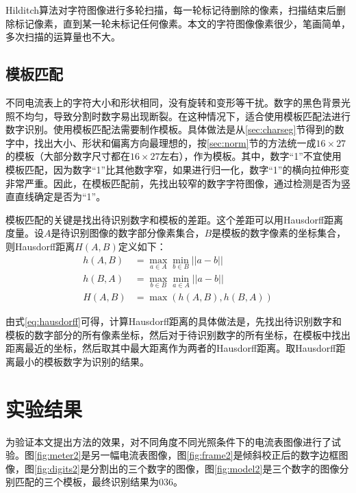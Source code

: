 Hilditch算法对字符图像进行多轮扫描，每一轮标记待删除的像素，扫描结束后删除标记像素，直到某一轮未标记任何像素。本文的字符图像像素很少，笔画简单，多次扫描的运算量也不大。

\subsection{模板匹配}

不同电流表上的字符大小和形状相同，没有旋转和变形等干扰。数字的黑色背景光照不均匀，导致分割时数字易出现断裂。在这种情况下，适合使用模板匹配法进行数字识别。使用模板匹配法需要制作模板。具体做法是从\ref{sec:charseg}节得到的数字中，找出大小、形状和偏离方向最理想的，按\ref{sec:norm}节的方法统一成$16\times 27$的模板（大部分数字尺寸都在$16\times 27$左右），作为模板。其中，数字“1”不宜使用模板匹配，因为数字“1”比其他数字窄，如果进行归一化，数字“1”的横向拉伸形变非常严重。因此，在模板匹配前，先找出较窄的数字字符图像，通过检测是否为竖直直线确定是否为“1”。

模板匹配的关键是找出待识别数字和模板的差距。这个差距可以用Hausdorff距离度量。设$A$是待识别图像的数字部分像素集合，$B$是模板的数字像素的坐标集合，则Hausdorff距离$H(A,B)$定义如下：
\begin{equation}
  \begin{aligned}
    h(A,B)&=\max_{a\in A}\min_{b\in B}||a-b||\\
    h(B,A)&=\max_{b\in B}\min_{a\in A}||a-b||\\
    H(A,B)&=\max(h(A,B),h(B,A))
  \end{aligned}
  \label{eq:hausdorff}
\end{equation}

由式\eqref{eq:hausdorff}可得，计算Hausdorff距离的具体做法是，先找出待识别数字和模板的数字部分的所有像素坐标，然后对于待识别数字的所有坐标，在模板中找出距离最近的坐标，然后取其中最大距离作为两者的Hausdorff距离。取Hausdorff距离最小的模板数字为识别的结果。

\section{实验结果}

为验证本文提出方法的效果，对不同角度不同光照条件下的电流表图像进行了试验。图\ref{fig:meter2}是另一幅电流表图像，图\ref{fig:frame2}是倾斜校正后的数字边框图像，图\ref{fig:digits2}是分割出的三个数字的图像，图\ref{fig:model2}是三个数字的图像分别匹配的三个模板，最终识别结果为036。

